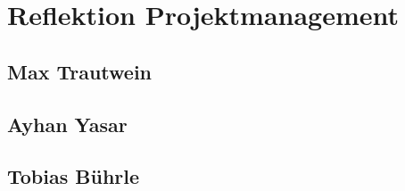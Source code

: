 \chapter{Reflektion Projektmanagement}\label{ch:reflektion-projektmanagement}


\section{Max Trautwein}


\section{Ayhan Yasar}


\section{Tobias Bührle}
